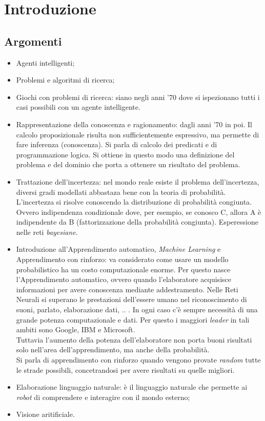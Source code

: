 \documentclass[10pt,a4paper]{book}
\begin{document}
\chapter{Introduzione}
\section{Argomenti}
\begin{itemize}
\item Agenti intelligenti;
\item Problemi e algoritmi di ricerca;
\item Giochi con problemi di ricerca: siano negli anni '70 dove si ispezionano tutti i casi possibili con un agente intelligente.
\item Rappresentazione della conoscenza e ragionamento: dagli anni '70 in poi. Il calcolo proposizionale risulta non sufficientemente espressivo, ma permette di fare inferenza (conoscenza). Si parla di calcolo dei predicati e di programmazione logica. Si ottiene in questo modo una definizione del problema e del dominio che porta a ottenere un risultato del problema.
\item Trattazione dell'incertezza: nel mondo reale esiste il problema dell'incertezza, diversi gradi modellati abbastaza bene con la teoria di probabilit\`a. L'incertezza si risolve conoscendo la distribuzione di probabilit\`a congiunta. Ovvero indipendenza condizionale dove, per esempio, se conosco C, allora A \`e indipendente da B (fattorizzazione della probabilit\`a congiunta). Esperessione nelle reti \textit{bayesiane}.
\item Introduzione all'Apprendimento automatico, \textit{Machine Learning} e Apprendimento con rinforzo: va considerato come usare un modello probabilistico ha un costo computazionale enorme. Per questo nasce l'Apprendimento automatico, ovvero quando l'elaboratore acquisisce informazioni per avere conoscenza mediante addestramento. Nelle Reti Neurali si superano le prestazioni dell'essere umano nel riconoscimento di suoni, parlato, elaborazione dati, .. .
In ogni caso c'\`e sempre necessit\`a di una grande potenza computazionale e dati. Per questo i maggiori \textit{leader} in tali ambiti sono Google, IBM e Microsoft.
\\
Tuttavia l'aumento della potenza dell'elaboratore non porta buoni risultati solo nell'area dell'apprendimento, ma anche della probabilit\`a.\\
Si parla di apprendimento con rinforzo quando vengono provate \textit{random} tutte le strade possibili, concetrandosi per avere risultati su quelle migliori.
\item Elaborazione linguaggio naturale: \`e il linguaggio naturale che permette ai \textit{robot} di comprendere e interagire con il mondo esterno;
\item Visione aritificiale.
\end{itemize}
\end{document}

